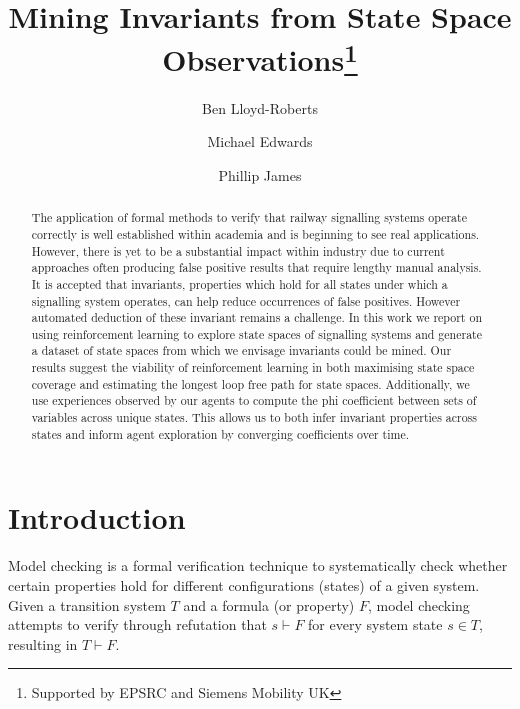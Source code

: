 \documentclass[runningheads]{llncs}
\begin{document}
%
\title{Mining Invariants from State Space Observations\thanks{Supported by EPSRC and Siemens Mobility UK}}
%
%
\author{Ben Lloyd-Roberts \and
Michael Edwards \and {Phillip James}}
%
%
%
\maketitle              %
%
\begin{abstract}
The application of formal methods to verify that railway signalling systems operate correctly is well established within academia and is beginning to see real applications. However, there is yet to be a substantial impact within industry due to current approaches often producing false positive results that require lengthy manual analysis. It is accepted that invariants, properties which hold for all states under which a signalling system operates, can help reduce occurrences of false positives. However automated deduction of these invariant remains a challenge. In this work we report on using reinforcement learning to explore state spaces of signalling systems and generate a dataset of state spaces from which we envisage invariants could be mined. Our results suggest the viability of reinforcement learning in both maximising state space coverage and estimating the longest loop free path for state spaces. Additionally, we use experiences observed by our agents to compute the phi coefficient between sets of variables across unique states. This allows us to both infer invariant properties across states and inform agent exploration by converging coefficients over time.

\end{abstract}
%
%
%
\section{Introduction}
Model checking is a formal verification technique to systematically
check whether certain properties hold for different configurations (states) of a given system.
Given a transition system $T$ and a formula (or property) $F$, model checking attempts to verify through refutation that $s \vdash F$ for every system state $s \in T$, resulting in $T \vdash F$. 
\end{document}
